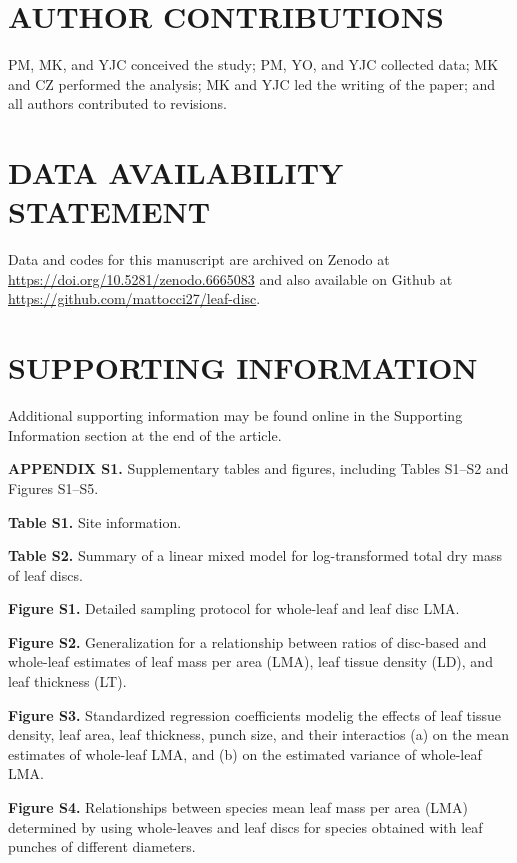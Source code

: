 \documentclass[
  12pt,
  a4paper,
,tablecaptionabove
]{scrartcl}
\begin{document}
\hypertarget{author-contributions}{%
\section{AUTHOR CONTRIBUTIONS}\label{author-contributions}}

PM, MK, and YJC conceived the study;
PM, YO, and YJC collected data;
MK and CZ performed the analysis;
MK and YJC led the writing of the paper; and
all authors contributed to revisions.

\hypertarget{data-availability-statement}{%
\section{DATA AVAILABILITY STATEMENT}\label{data-availability-statement}}

Data and codes for this manuscript are archived on Zenodo at \url{https://doi.org/10.5281/zenodo.6665083} and also available on Github at \url{https://github.com/mattocci27/leaf-disc}.

\hypertarget{supporting-information}{%
\section{SUPPORTING INFORMATION}\label{supporting-information}}

Additional supporting information may be found online in the Supporting Information section at the end of the article.

\textbf{APPENDIX S1.}
Supplementary tables and figures, including Tables S1--S2 and Figures S1--S5.

\textbf{Table S1.}
Site information.

\textbf{Table S2.}
Summary of a linear mixed model for log-transformed total dry mass of leaf discs.

\textbf{Figure S1.}
Detailed sampling protocol for whole-leaf and leaf disc LMA.

\textbf{Figure S2.}
Generalization for a relationship between ratios of disc-based and whole-leaf estimates of leaf mass per area (LMA), leaf tissue density (LD), and leaf thickness (LT).

\textbf{Figure S3.}
Standardized regression coefficients modelig the effects of leaf tissue density, leaf area, leaf thickness, punch size, and their interactios (a) on the mean estimates of whole-leaf LMA, and (b) on the estimated variance of whole-leaf LMA.

\textbf{Figure S4.}
Relationships between species mean leaf mass per area (LMA) determined by using whole-leaves and leaf discs for species obtained with leaf punches of different diameters.
\end{document}
